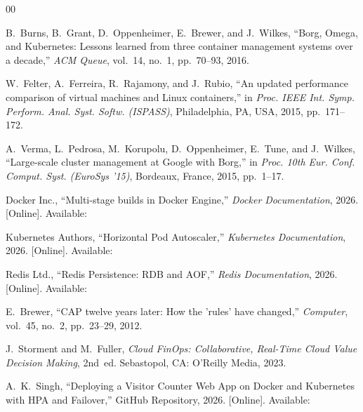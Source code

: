 \documentclass[conference]{IEEEtran}
\begin{document}
\begin{thebibliography}{00}

B.~Burns, B.~Grant, D.~Oppenheimer, E.~Brewer, and J.~Wilkes, ``Borg, Omega, and Kubernetes: Lessons learned from three container management systems over a decade,'' \emph{ACM Queue}, vol.~14, no.~1, pp.~70--93, 2016.

W.~Felter, A.~Ferreira, R.~Rajamony, and J.~Rubio, ``An updated performance comparison of virtual machines and Linux containers,'' in \emph{Proc. IEEE Int. Symp. Perform. Anal. Syst. Softw. (ISPASS)}, Philadelphia, PA, USA, 2015, pp.~171--172.

A.~Verma, L.~Pedrosa, M.~Korupolu, D.~Oppenheimer, E.~Tune, and J.~Wilkes, ``Large-scale cluster management at Google with Borg,'' in \emph{Proc. 10th Eur. Conf. Comput. Syst. (EuroSys '15)}, Bordeaux, France, 2015, pp.~1--17.

Docker Inc., ``Multi-stage builds in Docker Engine,'' \emph{Docker Documentation}, 2026. [Online]. Available: 

Kubernetes Authors, ``Horizontal Pod Autoscaler,'' \emph{Kubernetes Documentation}, 2026. [Online]. Available: 

Redis Ltd., ``Redis Persistence: RDB and AOF,'' \emph{Redis Documentation}, 2026. [Online]. Available: 

E.~Brewer, ``CAP twelve years later: How the 'rules' have changed,'' \emph{Computer}, vol.~45, no.~2, pp.~23--29, 2012.

J.~Storment and M.~Fuller, \emph{Cloud FinOps: Collaborative, Real-Time Cloud Value Decision Making}, 2nd~ed. Sebastopol, CA: O'Reilly Media, 2023.

A.~K.~Singh, ``Deploying a Visitor Counter Web App on Docker and Kubernetes with HPA and Failover,'' GitHub Repository, 2026. [Online]. Available: 

\end{thebibliography}
\end{document}
